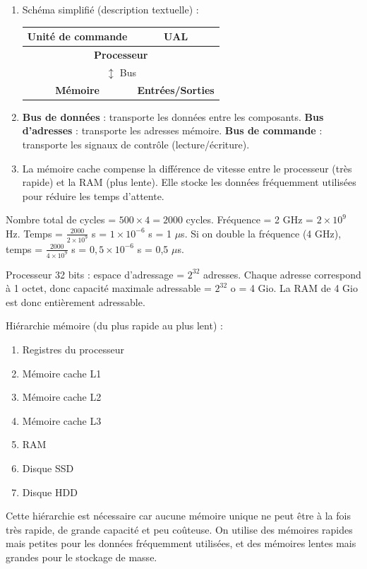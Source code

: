 \begin{enumerate}
    \item Schéma simplifié (description textuelle) :
          \begin{center}
          \begin{tabular}{|c|c|}
          \hline
          \textbf{Unité de commande} & \textbf{UAL} \\
          \hline
          \multicolumn{2}{|c|}{\textbf{Processeur}} \\
          \hline
          \multicolumn{2}{|c|}{$\updownarrow$ Bus} \\
          \hline
          \textbf{Mémoire} & \textbf{Entrées/Sorties} \\
          \hline
          \end{tabular}
          \end{center}
    \item \textbf{Bus de données} : transporte les données entre les composants.
          \textbf{Bus d’adresses} : transporte les adresses mémoire.
          \textbf{Bus de commande} : transporte les signaux de contrôle (lecture/écriture).
    \item La mémoire cache compense la différence de vitesse entre le processeur (très rapide) et la RAM (plus lente). Elle stocke les données fréquemment utilisées pour réduire les temps d’attente.
\end{enumerate}

Nombre total de cycles = $500 \times 4 = 2 000$ cycles.
Fréquence = 2 GHz = $2 \times 10^9$ Hz.
Temps = $\frac{2 000}{2 \times 10^9}$ s = $1 \times 10^{-6}$ s = 1 $\mu$s.
Si on double la fréquence (4 GHz), temps = $\frac{2 000}{4 \times 10^9}$ s = $0,5 \times 10^{-6}$ s = 0,5 $\mu$s.

Processeur 32 bits : espace d’adressage = $2^{32}$ adresses.
Chaque adresse correspond à 1 octet, donc capacité maximale adressable = $2^{32}$ o = 4 Gio.
La RAM de 4 Gio est donc entièrement adressable.

Hiérarchie mémoire (du plus rapide au plus lent) :
\begin{enumerate}
    \item Registres du processeur
    \item Mémoire cache L1
    \item Mémoire cache L2
    \item Mémoire cache L3
    \item RAM
    \item Disque SSD
    \item Disque HDD
\end{enumerate}
Cette hiérarchie est nécessaire car aucune mémoire unique ne peut être à la fois très rapide, de grande capacité et peu coûteuse. On utilise des mémoires rapides mais petites pour les données fréquemment utilisées, et des mémoires lentes mais grandes pour le stockage de masse.